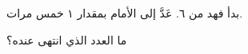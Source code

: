 
\begin{question}

\begin{instance}

\begin{mcq}[standalone=true]

\begin{stem}
بدأ فهد من ٦. عَدَّ إلى الأمام بمقدار ١ خمس مرات.\par
ما العدد الذي انتهى عنده؟\par
{}
\end{stem}

\begin{distractors}
\end{distractors}

\end{mcq}

\end{instance}

\end{question}
